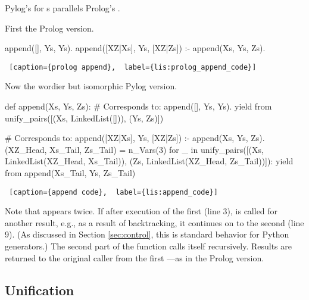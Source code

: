 Pylog's  for s parallels Prolog's .
\smallv

First the Prolog version.

\begin{minipage}{\linewidth}  \largev \hrulefill
\begin{python}
append([], Ys, Ys).
append([XZ|Xs], Ys, [XZ|Zs]) :- append(Xs, Ys, Zs).
\end{python}
\begin{lstlisting} [caption={prolog append},  label={lis:prolog_append_code}]
\end{lstlisting}
\end{minipage}
Now the wordier but isomorphic Pylog version.


\begin{minipage}{\linewidth}  \largev \hrulefill
\begin{python}[numbers=left]
def append(Xs, Ys, Zs):
  # Corresponds to: append([], Ys, Ys).
  yield from unify_pairs([(Xs, LinkedList([])), (Ys, Zs)])

  # Corresponds to: append([XZ|Xs], Ys, [XZ|Zs]) :- append(Xs, Ys, Zs).
  (XZ_Head, Xs_Tail, Zs_Tail) = n_Vars(3)
  for _ in unify_pairs([(Xs, LinkedList(XZ_Head, Xs_Tail)),
                       (Zs, LinkedList(XZ_Head, Zs_Tail))]):
    yield from append(Xs_Tail, Ys, Zs_Tail)

\end{python}
\begin{lstlisting} [caption={append code},  label={lis:append_code}]
\end{lstlisting}
\end{minipage}

Note that  appears twice. If after execution of the first  (line 3),  is called for another result, e.g., as a result of backtracking, it continues on to the second  (line 9). (As discussed in Section \ref{sec:control}, this is standard behavior for Python generators.) The second part of the function calls itself recursively. Results are returned to the original caller from the first ---as in the Prolog version. 

\subsection{Unification} \label{subsec:unify}

